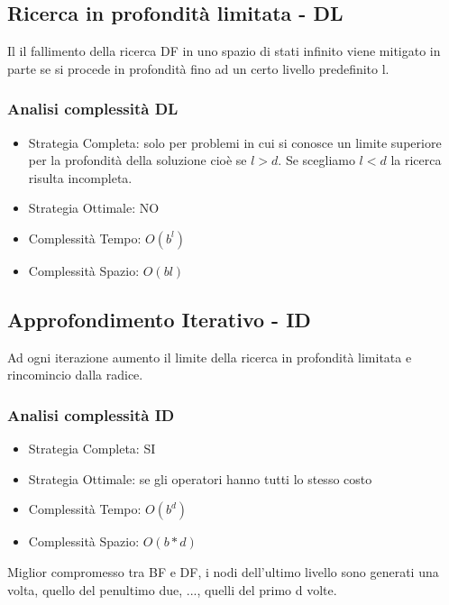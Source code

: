 \documentclass{article}
\begin{document}
\subsection{Ricerca in profondità limitata - DL}
Il il fallimento della ricerca DF in uno spazio di stati infinito viene mitigato in parte se si procede in profondità fino ad un certo livello predefinito l.
\subsubsection{Analisi complessità DL}
\begin{itemize}
    \item Strategia Completa: solo per problemi in cui si conosce un limite superiore per la profondità della soluzione cioè se $l>d$. Se scegliamo $l < d$ la ricerca risulta incompleta.
    \item Strategia Ottimale: NO
    \item Complessità Tempo: $O(b^l)$
    \item Complessità Spazio: $O(bl)$
\end{itemize}

\subsection{Approfondimento Iterativo - ID}
Ad ogni iterazione aumento il limite della ricerca in profondità limitata e rincomincio dalla radice.
\subsubsection{Analisi complessità ID}
\begin{itemize}
    \item Strategia Completa: SI
    \item Strategia Ottimale: se gli operatori hanno tutti lo stesso costo
    \item Complessità Tempo: $O(b^d)$
    \item Complessità Spazio: $O(b*d)$
\end{itemize}
Miglior compromesso tra BF e DF, i nodi dell'ultimo livello sono generati una volta, quello del penultimo due, ..., quelli del primo d volte.
\end{document}
